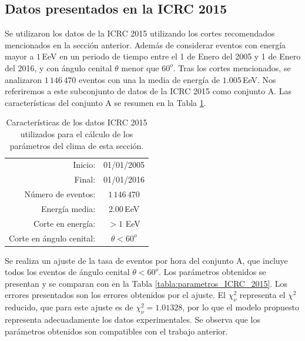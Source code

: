 
\subsection{Datos presentados en la ICRC 2015}\label{icrc2015}

Se utilizaron los datos de la ICRC 2015 utilizando los cortes recomendados mencionados en la sección anterior. Además de considerar eventos con energía mayor a $1\,$EeV en un periodo de tiempo entre el 1 de Enero del 2005 y 1 de Enero del 2016, y con ángulo cenital $\theta$ menor que $60^o$.  Tras los cortes mencionados, se analizaron $1\,146\,470$ eventos con una la media de energía de $1.005\,$EeV. Nos referiremos a este subconjunto de datos de la ICRC 2015  como conjunto A. Las características del conjunto A se resumen en la Tabla \ref{tabla:caracteristicas_ICRC_2015}.
        \begin{table}[H]
            \centering
            \begin{tabular}{r|c}
            Inicio:              & 01/01/2005 \\ 
            Final:               & 01/01/2016  \\ 
            Número de eventos:   & $1\,146\,470$ \\ 
            Energía media:       & 2.00\,EeV    				\\ 
            Corte en energía:    & $> 1$ EeV        				\\ 
            Corte en ángulo cenital:		& $\theta < 60^o$ 				\\ 
            \end{tabular}
        \caption{Características de los datos ICRC 2015 utilizados para el cálculo de los parámetros del clima de esta sección. } \label{tabla:caracteristicas_ICRC_2015}
        \end{table}

        Se realiza un ajuste de la tasa de eventos por hora del conjunto A, que incluye todos los eventos de ángulo cenital $\theta< 60^o$. Los parámetros obtenidos se presentan y se comparan con \cite{aab2017impact} en la Tabla \ref{tabla:parametros_ICRC_2015}. Los errores presentados son los errores obtenidos por el ajuste. El $\chi^2_\nu$ representa el $\chi^2$ reducido, que para este ajuste es de $\chi^2_\nu=1.01328$, por lo que el modelo propuesto representa adecuadamente los datos experimentales. Se observa que los parámetros obtenidos son compatibles con el trabajo anterior.

